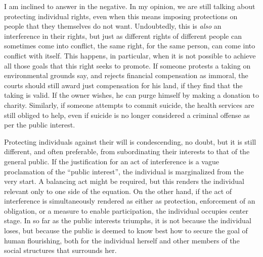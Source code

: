 I am inclined to answer in the negative. In my opinion, we are still talking about protecting individual rights, even when this means imposing protections on people that they themselves do not want. Undoubtedly, this is {\it also} an interference in their rights, but just as different rights of different people can sometimes come into conflict, the same right, for the same person, can come into conflict with itself. This happens, in particular, when it is not possible to achieve all those goals that this right seeks to promote. If someone protests a taking on environmental grounds say, and rejects financial compensation as immoral, the courts should still award just compensation for his land, if they find that the taking is valid. If the owner wishes, he can purge himself by making a donation to charity. Similarly, if someone attempts to commit suicide, the health services are still obliged to help, even if suicide is no longer considered a criminal offense as per the public interest. 

Protecting individuals against their will is condescending, no doubt, but it is still different, and often preferable, from subordinating their interests to that of the general public. If the justification for an act of interference is a vague proclamation of the ``public interest'', the individual is marginalized from the very start. A balancing act might be required, but this renders the individual relevant only to one side of the equation. On the other hand, if the act of interference is simultaneously rendered as either as protection, enforcement of an obligation, or a measure to enable participation, the individual occupies center stage. In so far as the public interests triumphs, it is not because the individual loses, but because the public is deemed to know best how to secure the goal of human flourishing, both for the individual herself and other members of the social structures that surrounds her.

